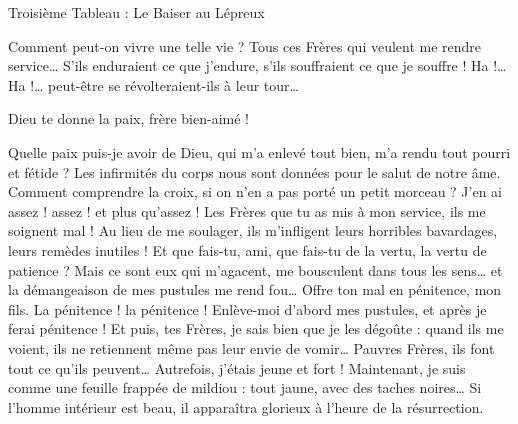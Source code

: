 \documentclass[a5paper,12pt]{article}
\begin{document}
\setlength\parindent{0pt}

\begin{center}
\large
Troisième Tableau : Le Baiser au Lépreux
\end{center}


\begin{dialogue}
   Comment peut-on vivre une telle vie ? Tous ces Frères qui veulent me rendre service… S'ils enduraient ce que j'endure, s'ils souffraient ce que je souffre ! Ha !… Ha !… peut-être se révolteraient-ils à leur tour…
\end{dialogue}


\begin{dialogue}
   Dieu te donne la paix, frère bien-aimé !
\end{dialogue}


\begin{dialogue}
   Quelle paix puis-je avoir de Dieu, qui m'a enlevé tout bien, m'a rendu tout pourri et fétide ?
   Les infirmités du corps nous sont données pour le salut de notre âme. Comment comprendre la croix, si on n'en a pas porté un petit morceau ?
   J'en ai assez ! assez ! et plus qu'assez ! Les Frères que tu as mis à mon service, ils me soignent mal ! Au lieu de me soulager, ils m'infligent leurs horribles bavardages, leurs remèdes inutiles !
   Et que fais-tu, ami, que fais-tu de la vertu, la vertu de patience ?
   Mais ce sont eux qui m'agacent, me bousculent dans tous les sens… et la démangeaison de mes pustules me rend fou…
   Offre ton mal en pénitence, mon fils.
   La pénitence ! la pénitence ! Enlève-moi d'abord mes pustules, et après je ferai pénitence ! Et puis, tes Frères, je sais bien que je les dégoûte : quand ils me voient, ils ne retiennent même pas leur envie de vomir…
   Pauvres Frères, ils font tout ce qu'ils peuvent…
   Autrefois, j'étais jeune et fort ! Maintenant, je suis comme une feuille frappée de mildiou : tout jaune, avec des taches noires…
   Si l'homme intérieur est beau, il apparaîtra glorieux à l'heure de la résurrection.
\end{dialogue}
\end{document}
